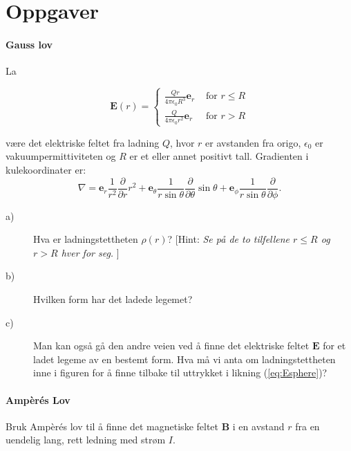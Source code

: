 \documentclass[twoside,utf8]{article}
\begin{document}
\part*{Oppgaver}


\subsection{Gauss lov}
La

\begin{equation}
\mathbf{E}(r) =
\begin{cases}
\frac{Qr}{4\pi \epsilon_0 R^3} \mathbf{e}_r &\text{ for } r \leq R \\
\frac{Q}{4\pi \epsilon_0 r^2} \mathbf{e}_r  &\text{ for } r > R
\end{cases}
\label{eq:Esphere}\end{equation}

være det elektriske feltet fra ladning $Q$, hvor $r$ er avstanden fra origo, $\epsilon_0$ er vakuumpermittiviteten og $R$ er et eller annet positivt tall. Gradienten i kulekoordinater er:
\begin{equation}
\nabla =
 \mathbf{e}_r \frac{1}{r^2}\frac{\partial}{\partial r}r^2
+\mathbf{e}_\theta \frac{1}{r\sin \theta}\frac{\partial}{\partial\theta}\sin \theta
+\mathbf{e}_\phi \frac{1}{r\sin \theta}\frac{\partial}{\partial\phi}.
\label{eq:sphereNabla}\end{equation}

\begin{description}
	\item[a)] Hva er ladningstettheten $\rho(r)$?
		[Hint: {\it Se på de to tilfellene $r\leq R$ og $r>R$ hver for seg. }]
	\item[b)] Hvilken form har det ladede legemet?
	\item[c)]
	Man kan også gå den andre veien ved å finne det elektriske feltet $\mathbf{E}$ for et ladet legeme av en bestemt form. Hva må vi anta om ladningstettheten inne i figuren for å finne tilbake til uttrykket i likning (\ref{eq:Esphere})?
\end{description}



\subsection{Ampèrés Lov}
Bruk Ampèrés lov til å finne det magnetiske feltet $\mathbf{B}$ i en avstand $r$ fra en uendelig lang, rett ledning med strøm $I$.
\end{document}
